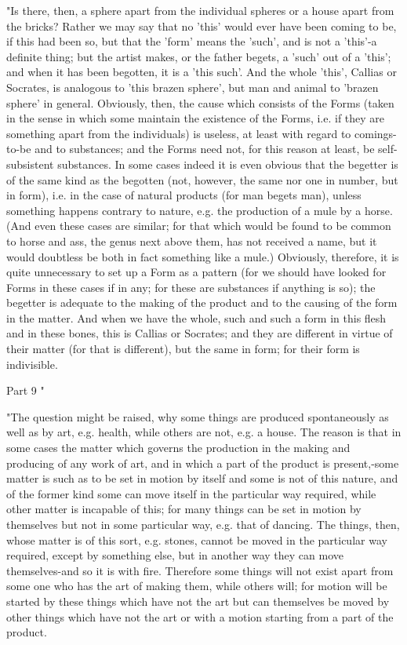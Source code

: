 "Is there, then, a sphere apart from the individual spheres or a house
apart from the bricks? Rather we may say that no 'this' would ever
have been coming to be, if this had been so, but that the 'form' means
the 'such', and is not a 'this'-a definite thing; but the artist makes,
or the father begets, a 'such' out of a 'this'; and when it has been
begotten, it is a 'this such'. And the whole 'this', Callias or Socrates,
is analogous to 'this brazen sphere', but man and animal to 'brazen
sphere' in general. Obviously, then, the cause which consists of the
Forms (taken in the sense in which some maintain the existence of
the Forms, i.e. if they are something apart from the individuals)
is useless, at least with regard to comings-to-be and to substances;
and the Forms need not, for this reason at least, be self-subsistent
substances. In some cases indeed it is even obvious that the begetter
is of the same kind as the begotten (not, however, the same nor one
in number, but in form), i.e. in the case of natural products (for
man begets man), unless something happens contrary to nature, e.g.
the production of a mule by a horse. (And even these cases are similar;
for that which would be found to be common to horse and ass, the genus
next above them, has not received a name, but it would doubtless be
both in fact something like a mule.) Obviously, therefore, it is quite
unnecessary to set up a Form as a pattern (for we should have looked
for Forms in these cases if in any; for these are substances if anything
is so); the begetter is adequate to the making of the product and
to the causing of the form in the matter. And when we have the whole,
such and such a form in this flesh and in these bones, this is Callias
or Socrates; and they are different in virtue of their matter (for
that is different), but the same in form; for their form is indivisible.

Part 9 "

"The question might be raised, why some things are produced spontaneously
as well as by art, e.g. health, while others are not, e.g. a house.
The reason is that in some cases the matter which governs the production
in the making and producing of any work of art, and in which a part
of the product is present,-some matter is such as to be set in motion
by itself and some is not of this nature, and of the former kind some
can move itself in the particular way required, while other matter
is incapable of this; for many things can be set in motion by themselves
but not in some particular way, e.g. that of dancing. The things,
then, whose matter is of this sort, e.g. stones, cannot be moved in
the particular way required, except by something else, but in another
way they can move themselves-and so it is with fire. Therefore some
things will not exist apart from some one who has the art of making
them, while others will; for motion will be started by these things
which have not the art but can themselves be moved by other things
which have not the art or with a motion starting from a part of the
product. 

